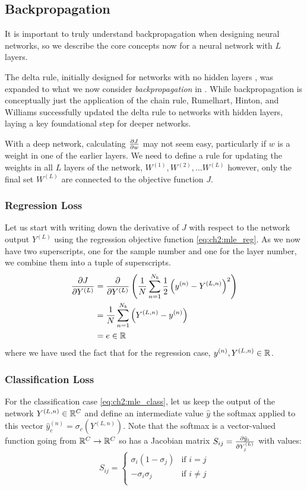 \subsection{Backpropagation}
It is important to truly understand backpropagation when designing neural
networks, so we describe the core concepts now for a neural network with
$L$ layers.

The delta rule, initially designed for networks with no hidden layers
\cite{widrow_neurocomputing:_1988}, was expanded to what we now consider
\emph{backpropagation} in \cite{rumelhart_parallel_1986}. While backpropagation
is conceptually just the application of the chain rule, Rumelhart, Hinton, and
Williams successfully updated the delta rule to networks with hidden layers,
laying a key foundational step for deeper networks.

With a deep network, calculating $\dydx{J}{w}$ may not seem easy,
particularly if $w$ is a weight in one of the earlier layers. We need
to define a rule for updating the weights in all $L$ layers of the network,
$W^{(1)}, W^{(2)}, \ldots W^{(L)}$ however, only the final set $W^{(L)}$ are
connected to the objective function $J$.

\subsubsection{Regression Loss}
Let us start with writing down the derivative of $J$ with respect to the network
output $Y^{(L)}$ using the regression objective function \eqref{eq:ch2:mle_reg}.
As we now have two superscripts,
one for the sample number and one for the layer number, we combine them into a
tuple of superscripts.
\begin{align}
  \dydx{J}{Y^{(L)}} &= \dydx{}{Y^{(L)}} \left( \frac{1}{N}\sum_{n=1}^{N_b}\frac{1}{2} \left(y^{(n)} - Y^{(L, n)}\right)^2\right) \\
                    &= \frac{1}{N}\sum_{n=1}^{N_b} \left(Y^{(L, n)} - y^{(n)} \right) \\
                    &= e \in \reals \label{eq:ch2:reg_b1}
\end{align}
where we have used the fact that for the regression case, $y^{(n)}, Y^{(L,n)}
\in \reals$.

\subsubsection{Classification Loss}
For the classification case \eqref{eq:ch2:mle_class}, let us keep the output of
the network $Y^{(L,n)} \in \reals[C]$ and define an intermediate value $\hat{y}$ the
softmax applied to this vector $\hat{y}^{(n)}_c = \sigma_c\left(Y^{(L, n)}\right)$.
Note that the softmax is a vector-valued function going from $\reals[C] \rightarrow
\reals[C]$ so has a Jacobian matrix $S_{ij} = \dydx{\hat{y}_i}{Y^{(L)}_j}$ with
values:
\begin{equation}
  S_{ij} = \begin{cases}
    \sigma_i (1-\sigma_j) & \text{if $i=j$}\\
    -\sigma_i \sigma_j & \text{if $i\neq j$}\\
  \end{cases}
\end{equation}

